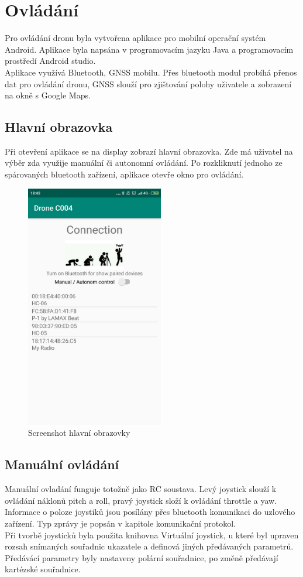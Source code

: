 \chapter{Ovládání}
\label{7-aplikace}
Pro ovládání dronu byla vytvořena aplikace pro mobilní operační systém Android. Aplikace byla napsána v programovacím jazyku Java a programovacím prostředí Android studio.\cite{android} \cite{codemitch}\\
Aplikace využívá Bluetooth, GNSS mobilu. Přes bluetooth modul probíhá přenos dat pro ovládání dronu, GNSS slouží pro zjištování polohy uživatele a zobrazení na okně s Google Maps.\\

\section{Hlavní obrazovka}
Při otevření aplikace se na display zobrazí hlavní obrazovka. Zde má uživatel na výběr zda využije manuální či autonomní ovládání. Po rozkliknutí jednoho ze spárovaných bluetooth zařízení, aplikace otevře okno pro ovládání.\\
\begin{figure}[H]
	\centering
	\includegraphics[width=6cm]{pictures/app1.png}
	\caption{Screenshot hlavní obrazovky}
\end{figure}

\section{Manuální ovládání} 
Manuální ovladání funguje totožně jako RC soustava. Levý joystick slouží k ovládání náklonů pitch a roll, pravý joystick složí k ovládání throttle a yaw. Informace o poloze joystiků jsou posílány přes bluetooth komunikaci do uzlového zařízení. Typ zprávy je popsán v kapitole komunikační protokol.\\
Při tvorbě joysticků byla použita knihovna Virtuální joystick, u které byl upraven rozsah snímaných souřadnic ukazatele a definová jiných předávaných parametrů. Předávácí parametry byly nastaveny polární souřadnice, po změně předávají kartézské souřadnice. \cite{joystick}\\\\

